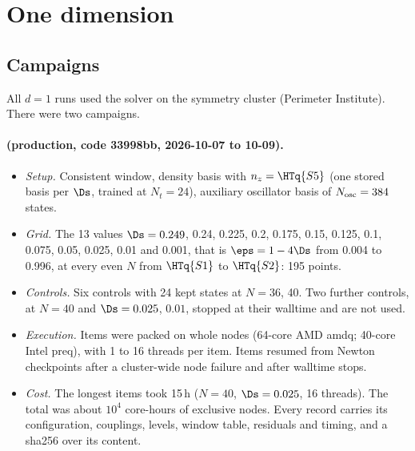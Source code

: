 \section{One dimension}\label{sec:d1}

\subsection{Campaigns}\label{sec:d1-campaigns}
All $d=1$ runs used the solver  on the symmetry cluster (Perimeter
Institute). There were two campaigns.

\paragraph{ (production, code 33998bb, 2026-10-07 to 10-09).}
\begin{itemize}
\item \emph{Setup.} Consistent window, density basis with $n_z=\HTq{S5}$ (one stored basis per $\Ds$, trained at
 $N_t=24$), auxiliary oscillator basis of $N_{\rm osc}=384$ states.
\item \emph{Grid.} The 13 values $\Ds=0.249$, 0.24, 0.225, 0.2, 0.175, 0.15, 0.125, 0.1, 0.075, 0.05, 0.025, 0.01 and 0.001,
 that is $\eps=1-4\Ds$ from 0.004 to 0.996, at every even $N$ from $\HTq{S1}$ to $\HTq{S2}$: 195 points.
\item \emph{Controls.} Six controls with 24 kept states at $N=36$, 40. Two further controls, at $N=40$ and
 $\Ds=0.025$, $0.01$, stopped at their walltime and are not used.
\item \emph{Execution.} Items were packed on whole nodes (64-core AMD amdq; 40-core Intel preq), with 1 to 16
 threads per item. Items resumed from Newton checkpoints after a cluster-wide node failure and after walltime stops.
\item \emph{Cost.} The longest items took 15\,h ($N=40$, $\Ds=0.025$, 16 threads). The total was about $10^4$
 core-hours of exclusive nodes. Every record carries its configuration, couplings, levels, window table, residuals
 and timing, and a sha256 over its content.
\end{itemize}

